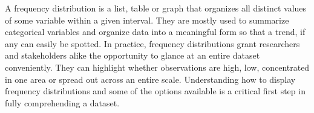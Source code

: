 A frequency distribution is a list, table or graph that organizes all distinct
values of some variable within a given interval. They are mostly used to summarize
categorical variables and organize data into a meaningful form so that a trend, 
if any can easily be spotted. In practice, frequency distributions grant researchers 
and stakeholders alike the opportunity to glance at an entire dataset conveniently. 
They can highlight whether observations are high, low, concentrated in one area or 
spread out across an entire scale. Understanding how to display frequency distributions
and some of the options available is a critical first step in fully comprehending 
a dataset.  